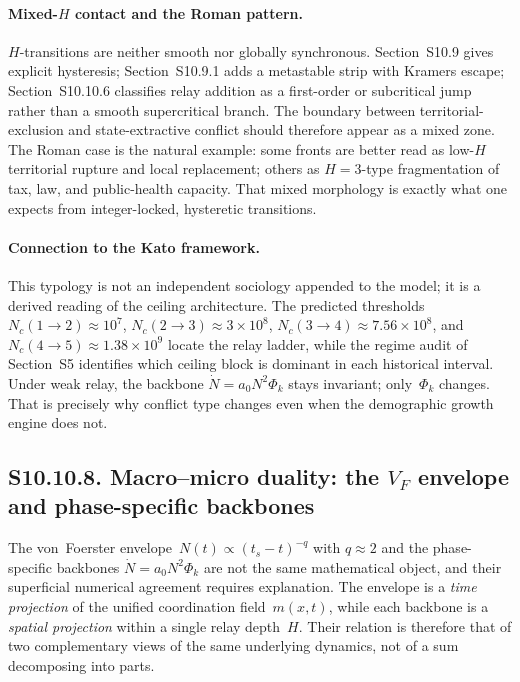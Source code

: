 \documentclass[11pt]{article}
\begin{document}
\paragraph{Mixed-$H$ contact and the Roman pattern.}
$H$-transitions are neither smooth nor globally synchronous.
Section~S10.9 gives explicit hysteresis; Section~S10.9.1 adds a
metastable strip with Kramers escape; Section~S10.10.6 classifies relay
addition as a first-order or subcritical jump rather than a smooth
supercritical branch.  The boundary between territorial-exclusion and
state-extractive conflict should therefore appear as a mixed zone.  The
Roman case is the natural example: some fronts are better read as
low-$H$ territorial rupture and local replacement; others as $H=3$-type
fragmentation of tax, law, and public-health capacity.  That mixed
morphology is exactly what one expects from integer-locked, hysteretic
transitions.

\paragraph{Connection to the Kato framework.}
This typology is not an independent sociology appended to the model; it
is a derived reading of the ceiling architecture.  The predicted
thresholds $N_c(1\to 2)\approx 10^7$,
$N_c(2\to 3)\approx 3\times 10^8$,
$N_c(3\to 4)\approx 7.56\times 10^8$, and
$N_c(4\to 5)\approx 1.38\times 10^9$ locate the relay ladder, while
the regime audit of Section~S5 identifies which ceiling block is
dominant in each historical interval.  Under weak relay, the backbone
$\dot{N}=a_0 N^2 \Phi_k$ stays invariant; only~$\Phi_k$ changes.  That
is precisely why conflict type changes even when the demographic growth
engine does not.


\subsection*{S10.10.8. Macro--micro duality: the $V_F$ envelope and phase-specific backbones}
\label{sec:S10_10_8_VF_backbone_duality}

The von~Foerster envelope~$N(t)\propto(t_s-t)^{-q}$ with $q\approx 2$
and the phase-specific backbones $\dot{N}=a_0 N^2 \Phi_k$ are not the
same mathematical object, and their superficial numerical agreement
requires explanation.  The envelope is a \emph{time projection} of the
unified coordination field~$m(x,t)$, while each backbone is a
\emph{spatial projection} within a single relay depth~$H$.  Their
relation is therefore that of two complementary views of the same
underlying dynamics, not of a sum decomposing into parts.
\end{document}
